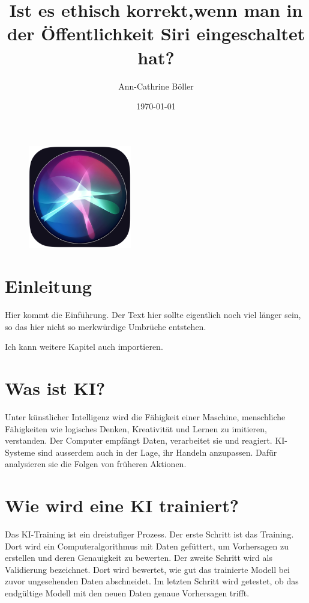 \documentclass{article}
\title{Ist es ethisch korrekt,wenn man in der Öffentlichkeit Siri eingeschaltet hat?}
\author{Ann-Cathrine Böller}
\date{\today}
\begin{document}
\maketitle

\begin{figure}[ht]
    \centering
    \includegraphics[width=0.4\textwidth]{siri.jpg}
    \label{fig:siri}
    \end{figure}




\tableofcontents

\section{Einleitung}

Hier kommt die Einführung. Der Text hier sollte eigentlich noch viel länger sein, so das hier nicht so merkwürdige Umbrüche entstehen.

Ich kann weitere Kapitel auch importieren.




\section{Was ist KI?}
Unter künstlicher Intelligenz wird die Fähigkeit einer Maschine, menschliche Fähigkeiten wie logisches Denken, Kreativität und Lernen zu imitieren, verstanden.
Der Computer empfängt Daten, verarbeitet sie und reagiert. KI-Systeme sind ausserdem auch in der Lage, ihr Handeln anzupassen. Dafür analysieren sie die Folgen von früheren Aktionen.

\section{Wie wird eine KI trainiert?}
Das KI-Training ist ein dreistufiger Prozess. Der erste Schritt ist das Training. Dort wird ein Computeralgorithmus mit Daten gefüttert, um Vorhersagen zu erstellen und deren Genauigkeit zu bewerten. Der zweite Schritt wird als Validierung bezeichnet. Dort wird bewertet, wie gut das trainierte Modell bei zuvor ungesehenden Daten abschneidet. Im letzten Schritt wird getestet, ob das endgültige Modell mit den neuen Daten genaue Vorhersagen trifft.
\end{document}
